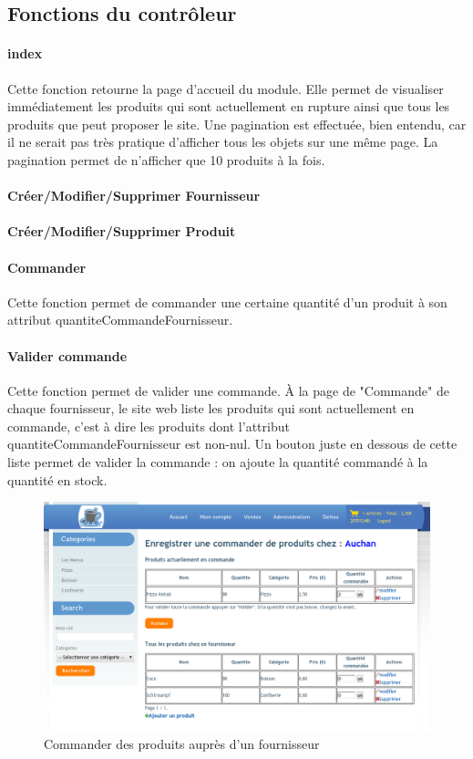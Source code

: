 \documentclass[twoside,UTF8]{EPURapport}
\begin{document}
    \subsection{Fonctions du contrôleur}
\paragraph{index} Cette fonction retourne la page d'accueil du module. Elle permet de visualiser immédiatement les produits qui sont actuellement en rupture ainsi que tous les produits que peut proposer le site. Une pagination est effectuée, bien entendu, car il ne serait pas très pratique d'afficher tous les objets sur une même page. La pagination permet de n'afficher que 10 produits à la fois.

\paragraph{Créer/Modifier/Supprimer Fournisseur}

\paragraph{Créer/Modifier/Supprimer Produit}

\paragraph{Commander} Cette fonction permet de commander une certaine quantité d'un produit à son attribut quantiteCommandeFournisseur.

\paragraph{Valider commande} Cette fonction permet de valider une commande. À la page de "Commande" de chaque fournisseur, le site web liste les produits qui sont actuellement en commande, c'est à dire les produits dont l'attribut quantiteCommandeFournisseur est non-nul. Un bouton juste en dessous de cette liste permet de valider la commande : on ajoute la quantité commandé à la quantité en stock.


\begin{figure}[H]
    \centering
    \includegraphics[width=\linewidth]{./logos/gestionStock.png}
    \caption{Commander des produits auprès d'un fournisseur}
\end{figure}
\end{document}
